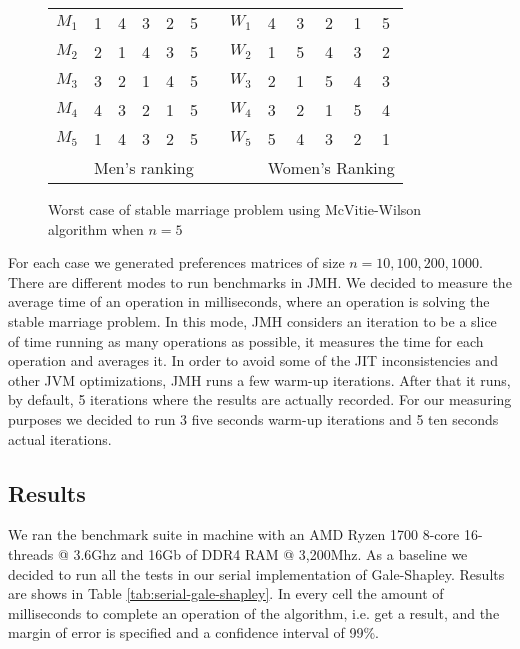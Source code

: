 \begin{figure}
    \centering
    
    \begin{tabular}{lllllllllllll}
$M_1$ & 1     & 4    & 3    & 2    & 5    &  & $W_1$ & 4     & 3     & 2     & 1    & 5    \\
$M_2$ & 2     & 1    & 4    & 3    & 5    &  & $W_2$ & 1     & 5     & 4     & 3    & 2    \\
$M_3$ & 3     & 2    & 1    & 4    & 5    &  & $W_3$ & 2     & 1     & 5     & 4    & 3    \\
$M_4$ & 4     & 3    & 2    & 1    & 5    &  & $W_4$ & 3     & 2     & 1     & 5    & 4    \\
$M_5$ & 1     & 4    & 3    & 2    & 5    &  & $W_5$ & 5     & 4     & 3     & 2    & 1    \\
   & \multicolumn{5}{l}{Men's ranking} &  &    & \multicolumn{5}{l}{Women's Ranking}
\end{tabular}
    
    \caption{Worst case of stable marriage problem using McVitie-Wilson algorithm when $n=5$}
    \label{fig:worst_case}
\end{figure}

For each case we generated preferences matrices of size $n = {10, 100, 200, 1000}$. There are different modes to run benchmarks in JMH. We decided to measure the average time of an operation in milliseconds, where an operation is solving the stable marriage problem. In this mode, JMH considers an iteration to be a slice of time running as many operations as possible, it measures the time for each operation and averages it. In order to avoid some of the JIT inconsistencies and other JVM  optimizations, JMH runs a few warm-up iterations. After that it runs, by default, 5 iterations where the results are actually recorded. For our measuring purposes we decided to run 3  five seconds warm-up iterations and 5 ten seconds actual iterations.

\subsection{Results}

We ran the benchmark suite in machine with an AMD Ryzen 1700 8-core 16-threads @ 3.6Ghz and 16Gb of DDR4 RAM @ 3,200Mhz. As a baseline we decided to run all the tests in our serial implementation of Gale-Shapley. Results are shows in Table \ref{tab:serial-gale-shapley}. In every cell the amount of milliseconds to complete an operation of the algorithm, i.e. get a result, and the margin of error is specified and a confidence interval of 99\%. 

